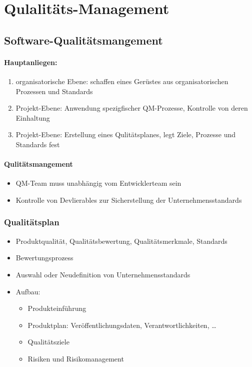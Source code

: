 \chapter{Qulalitäts-Management}
\section{Software-Qualitätsmangement}
\subsubsection{Hauptanliegen:}
\begin{enumerate}
    \item organisatorische Ebene: schaffen eines Gerüstes aus organisatorischen Prozessen und Standards
    \item Projekt-Ebene: Anwendung spezigfischer QM-Prozesse, Kontrolle von deren Einhaltung
    \item Projekt-Ebene: Erstellung eines Qulitätsplanes, legt Ziele, Prozesse und Standards fest
\end{enumerate}

\subsubsection{Qulitätsmangement}
\begin{itemize}
    \item QM-Team muss unabhängig vom Entwicklerteam sein
    \item Kontrolle von Devlierables zur Sicherstellung der Unternehmensstandards
\end{itemize}

\subsection{Qualitätsplan}
\begin{itemize}
    \item Produktqualität, Qualitätsbewertung, Qualitätsmerkmale, Standards
    \item Bewertungsprozess
    \item Auswahl oder Neudefinition von Unternehmensstandards
    \item Aufbau:
    \begin{itemize}
        \item Produkteinführung
        \item Produktplan: Veröffentlichungsdaten, Verantwortlichkeiten, \dots
        \item Qualitätsziele
        \item Risiken und Risikomanagement
    \end{itemize}
\end{itemize}
